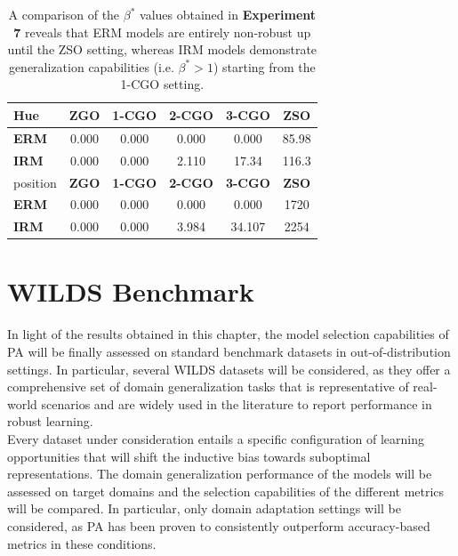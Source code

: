 \begin{table}[H]
    \centering
    \begin{tabular}{l|c|c|c|c|c}
    Hue & \textbf{ZGO} & \textbf{1-CGO} & \textbf{2-CGO} & \textbf{3-CGO} & \textbf{ZSO}\\
    \midrule
    \textbf{{\color{tab:blue} \textbf{ERM}}}   & 0.000  & 0.000  & 0.000  & 0.000  & 85.98  \\
    \textbf{{\color{tab:orange} \textbf{IRM}}}  & 0.000  & 0.000  & 2.110 & 17.34 & 116.3   \\
    \midrule
    \addlinespace
    \addlinespace
    position & \textbf{ZGO} & \textbf{1-CGO} & \textbf{2-CGO} & \textbf{3-CGO} & \textbf{ZSO}\\
    \midrule
    \textbf{{\color{tab:blue} \textbf{ERM}}}   & 0.000 & 0.000  & 0.000  & 0.000  & 1720    \\
    \textbf{{\color{tab:orange} \textbf{IRM}}}  & 0.000 & 0.000  & 3.984  & 34.107  & 2254     \\
    \bottomrule
    \end{tabular}
    \caption{
        A comparison of the $\beta^{*}$ values obtained in \textbf{Experiment 7} reveals that ERM 
        models are entirely non-robust up until the ZSO setting, whereas IRM models demonstrate 
        generalization capabilities (i.e. $\beta^{*}> 1$) starting from the 1-CGO setting. 
    }
    \label{tab:sogo_betas}
\end{table}


 \section{WILDS Benchmark}

In light of the results obtained in this chapter, the model selection 
capabilities of PA will be finally assessed on standard benchmark datasets in out-of-distribution settings. 
In particular, several WILDS \cite{kohWILDSBenchmarkIntheWild2021} 
datasets will be considered, as they offer a comprehensive set of domain generalization 
tasks that is representative of real-world scenarios and are widely used in the literature to report 
performance in robust learning. \\

Every dataset under consideration entails a specific configuration of 
learning opportunities that will shift the inductive bias towards suboptimal representations. The domain 
generalization performance of the models will be assessed on target domains and the selection capabilities of
the different metrics will be compared. In particular, only domain adaptation settings 
will be considered, as PA has been proven to consistently outperform accuracy-based metrics 
in these conditions. \\

